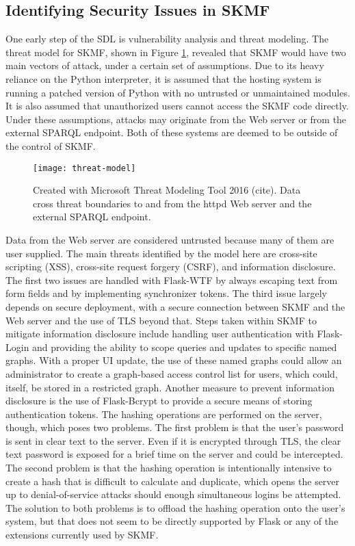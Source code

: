 \subsection{Identifying Security Issues in SKMF}
\label{method:threats}

One early step of the SDL is vulnerability analysis and threat modeling. The threat model for SKMF, shown in Figure
\ref{threat-model},
revealed that SKMF would have two main vectors of attack, under a certain set of assumptions. Due to its heavy reliance on the Python interpreter, it is assumed that the hosting system is running a patched version of Python with no untrusted or unmaintained modules. It is also assumed that unauthorized users cannot access the SKMF code directly. Under these assumptions, attacks may originate from the Web server or from the external SPARQL endpoint. Both of these systems are deemed to be outside of the control of SKMF.

\begin{figure}
\texttt{[image: threat-model]}
\caption[Data flow diagram with threat boundaries]
 {\narrower Created with Microsoft Threat Modeling Tool 2016 (cite). Data cross threat boundaries to and from the httpd Web server and the external SPARQL endpoint.
 }
\label{threat-model}
\end{figure}

Data from the Web server are considered untrusted because many of them are user supplied. The main threats identified by the model here are cross-site scripting (XSS), cross-site request forgery (CSRF), and information disclosure. The first two issues are handled with Flask-WTF by always escaping text from form fields and by implementing synchronizer tokens. The third issue largely depends on secure deployment, with a secure connection between SKMF and the Web server and the use of TLS beyond that. Steps taken within SKMF to mitigate information disclosure include handling user authentication with Flask-Login and providing the ability to scope queries and updates to specific named graphs. With a proper UI update, the use of these named graphs could allow an administrator to create a graph-based access control list for users, which could, itself, be stored in a restricted graph. Another measure to prevent information disclosure is the use of Flask-Bcrypt to provide a secure means of storing authentication tokens. The hashing operations are performed on the server, though, which poses two problems. The first problem is that the user's password is sent in clear text to the server. Even if it is encrypted through TLS, the clear text password is exposed for a brief time on the server and could be intercepted. The second problem is that the hashing operation is intentionally intensive to create a hash that is difficult to calculate and duplicate, which opens the server up to denial-of-service attacks should enough simultaneous logins be attempted. The solution to both problems is to offload the hashing operation onto the user's system, but that does not seem to be directly supported by Flask or any of the extensions currently used by SKMF.

